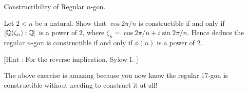\documentclass[../book.tex]{subfiles}
\begin{document}
\begin{ex} Constructibility of Regular $n$-gon.
    
    Let $2 < n$ be a natural. 
    Show that $\cos{2\pi / n}$ is constructible if and only if 
    $[\mathbb{Q}(\zeta_n) : \mathbb{Q}]$ is a power of 2, 
    where $\zeta_n = \cos{2\pi/n} + i\sin{2\pi/n}$.
    Hence deduce the regular $n$-gon is constructible if and only if 
    $\phi(n)$ is a power of $2$. 
    
    [Hint : For the reverse implication, Sylow I. ]
\end{ex}

\begin{rmk}
    
    The above exercise is amazing because
    you now know the regular 17-gon is constructible
    without needing to construct it at all!
    
\end{rmk}
\end{document}
